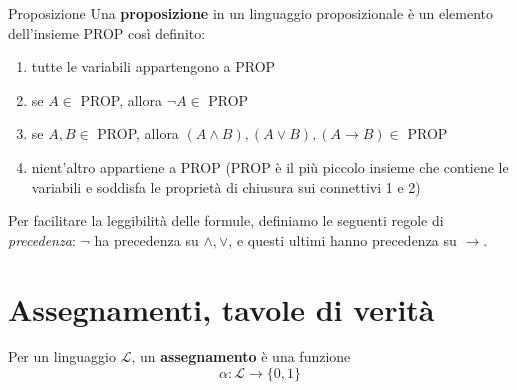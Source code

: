 \documentclass[a4paper,11pt]{report}
\begin{document}
\begin{defbox}{Proposizione}{}
    Una \textbf{proposizione} in un linguaggio proposizionale è un elemento dell'insieme PROP così definito:
    \begin{enumerate}
        \item tutte le variabili appartengono a PROP
        \item se \( A \in \) PROP, allora \( \neg A \in \) PROP
        \item se \( A, B \in \) PROP, allora \( (A \land B), (A \lor B), (A \to B) \in \) PROP
        \item nient'altro appartiene a PROP {\color{gray}(PROP è il più piccolo insieme che contiene le variabili e soddisfa le proprietà di chiusura sui connettivi 1 e 2)}
    \end{enumerate}
\end{defbox}

Per facilitare la leggibilità delle formule, definiamo le seguenti regole di \textit{precedenza}: \( \neg \) ha precedenza su \( \land, \lor \), e questi ultimi hanno precedenza su \( \to \).

\section{Assegnamenti, tavole di verità}

Per un linguaggio \( \mathcal{L} \), un \textbf{assegnamento} è una funzione 
\[
    \alpha : \mathcal{L} \to \{0, 1\}
\]
\end{document}
